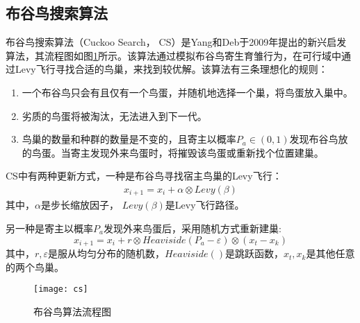   \subsection{布谷鸟搜索算法}
    布谷鸟搜索算法（Cuckoo Search， CS）\cite{cs}是Yang和Deb于2009年提出的新兴启发算法，其流程图如图\ref{fig:cs}所示。该算法通过模拟布谷鸟寄生育雏行为，在可行域中通过Levy飞行寻找合适的鸟巢，来找到较优解。该算法有三条理想化的规则：
    \begin{enumerate}
      \item {一个布谷鸟只会有且仅有一个鸟蛋，并随机地选择一个巢，将鸟蛋放入巢中。}
      \item {劣质的鸟蛋将被淘汰，无法进入到下一代。}
      \item {鸟巢的数量和种群的数量是不变的，且寄主以概率$P_a\in(0,1)$发现布谷鸟放的鸟蛋。当寄主发现外来鸟蛋时，将摧毁该鸟蛋或重新找个位置建巢。}
    \end{enumerate}

    CS中有两种更新方式，一种是布谷鸟寻找宿主鸟巢的Levy飞行：
    \begin{align}
      x_{i+1}=x_i+\alpha\otimes Levy(\beta)
    \end{align}
    其中，$\alpha$是步长缩放因子， $Levy(\beta)$是Levy飞行路径。

    另一种是寄主以概率$P_a$发现外来鸟蛋后，采用随机方式重新建巢:
    \begin{equation}
      x_{i+1}=x_i+r\otimes Heaviside(P_a-\varepsilon)\otimes(x_t-x_k)
    \end{equation}
    其中，$r,\varepsilon$是服从均匀分布的随机数，$Heaviside()$是跳跃函数，$x_t,x_k$是其他任意的两个鸟巢。
    \begin{figure}[htbp]
      \centering
      \texttt{[image: cs]}
      \caption{布谷鸟算法流程图}
      \label{fig:cs}
    \end{figure}

